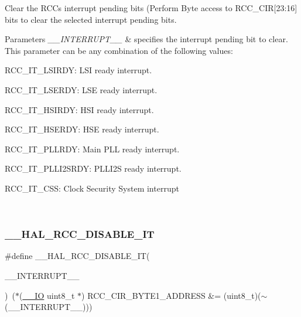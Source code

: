 Clear the R\+CC\textquotesingle{}s interrupt pending bits (Perform Byte access to R\+C\+C\+\_\+\+C\+IR\mbox{[}23\+:16\mbox{]} bits to clear the selected interrupt pending bits. 


\begin{DoxyParams}{Parameters}
{\em \+\_\+\+\_\+\+I\+N\+T\+E\+R\+R\+U\+P\+T\+\_\+\+\_\+} & specifies the interrupt pending bit to clear. This parameter can be any combination of the following values\+: \begin{DoxyItemize}
\item R\+C\+C\+\_\+\+I\+T\+\_\+\+L\+S\+I\+R\+DY\+: L\+SI ready interrupt. \item R\+C\+C\+\_\+\+I\+T\+\_\+\+L\+S\+E\+R\+DY\+: L\+SE ready interrupt. \item R\+C\+C\+\_\+\+I\+T\+\_\+\+H\+S\+I\+R\+DY\+: H\+SI ready interrupt. \item R\+C\+C\+\_\+\+I\+T\+\_\+\+H\+S\+E\+R\+DY\+: H\+SE ready interrupt. \item R\+C\+C\+\_\+\+I\+T\+\_\+\+P\+L\+L\+R\+DY\+: Main P\+LL ready interrupt. \item R\+C\+C\+\_\+\+I\+T\+\_\+\+P\+L\+L\+I2\+S\+R\+DY\+: P\+L\+L\+I2S ready interrupt. \item R\+C\+C\+\_\+\+I\+T\+\_\+\+C\+SS\+: Clock Security System interrupt \end{DoxyItemize}
\\
\hline
\end{DoxyParams}
\mbox{\label{group___r_c_c___flags___interrupts___management_gafc4df8cd4df0a529d11f18bf1f7e9f50}} 
\subsubsection{\texorpdfstring{\+\_\+\+\_\+\+H\+A\+L\+\_\+\+R\+C\+C\+\_\+\+D\+I\+S\+A\+B\+L\+E\+\_\+\+IT}{\_\_HAL\_RCC\_DISABLE\_IT}}
{\footnotesize\ttfamily \#define \+\_\+\+\_\+\+H\+A\+L\+\_\+\+R\+C\+C\+\_\+\+D\+I\+S\+A\+B\+L\+E\+\_\+\+IT(\begin{DoxyParamCaption}\item[{}]{\+\_\+\+\_\+\+I\+N\+T\+E\+R\+R\+U\+P\+T\+\_\+\+\_\+ }\end{DoxyParamCaption})~($\ast$(\mbox{\hyperlink{core__sc300_8h_aec43007d9998a0a0e01faede4133d6be}{\+\_\+\+\_\+\+IO}} uint8\+\_\+t $\ast$) R\+C\+C\+\_\+\+C\+I\+R\+\_\+\+B\+Y\+T\+E1\+\_\+\+A\+D\+D\+R\+E\+SS \&= (uint8\+\_\+t)($\sim$(\+\_\+\+\_\+\+I\+N\+T\+E\+R\+R\+U\+P\+T\+\_\+\+\_\+)))}



